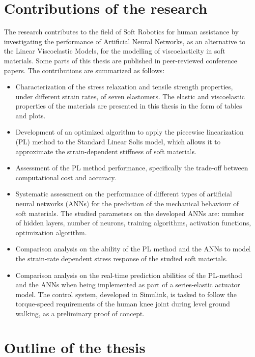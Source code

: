\section{Contributions of the research}

The research contributes to the field of Soft Robotics for human assistance by investigating the performance of Artificial Neural Networks, as an alternative to the Linear Viscoelastic Models, for the modelling of viscoelasticity in soft materials. Some parts of this thesis are published in peer-reviewed conference papers. The contributions are summarized as follows:

\begin{itemize}
    \item Characterization of the stress relaxation and tensile strength properties, under different strain rates, of seven elastomers. The elastic and viscoelastic properties of the materials are presented in this thesis in the form of tables and plots.
    \item Development of an optimized algorithm to apply the piecewise linearization (PL) method to the Standard Linear Solis model, which allows it to approximate the strain-dependent stiffness of soft materials.
    \item Assessment of the PL method performance, specifically the trade-off between computational cost and accuracy.
    \item Systematic assessment on the performance of different types of artificial neural networks (ANNs) for the prediction of the mechanical behaviour of soft materials. The studied parameters on the developed ANNs are: number of hidden layers, number of neurons, training algorithms, activation functions, optimization algorithm.
    \item Comparison analysis on the ability of the PL method and the ANNs to model the strain-rate dependent stress response of the studied soft materials.
    \item Comparison analysis on the real-time prediction abilities of the PL-method and the ANNs when being implemented as part of a series-elastic actuator model. The control system, developed in Simulink, is tasked to follow the torque-speed requirements of the human knee joint during level ground walking, as a preliminary proof of concept.
\end{itemize}

\section{Outline of the thesis}

